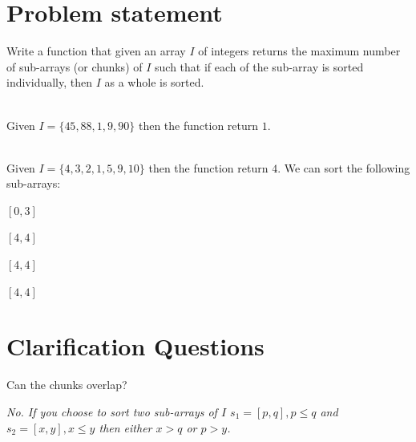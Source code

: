 \section{Problem statement}
\begin{exercise}
\label{example:max_num_chunks_sorted:exercice1}
Write a function that given an array $I$ of integers returns the maximum number of sub-arrays (or chunks) of $I$ 
such that if each of the sub-array is sorted individually, then $I$ as a whole is sorted.

    \begin{example}
        \label{example:max_num_chunks_sorted:example1}
        \hfill \\
        Given $I=\{45,88,1,9,90\}$ then the function return $1$.
        
    \end{example}

    \begin{example}
        \label{example:max_num_chunks_sorted:example2}
        \hfill \\
        Given $I=\{4,3,2,1,5,9,10\}$ then the function return $4$. We can sort the following sub-arrays:
        \begin{itemize*}
            \item $[0,3]$
            \item $[4,4]$
            \item $[4,4]$
            \item $[4,4]$
        \end{itemize*}
    \end{example}
\end{exercise}

\section{Clarification Questions}

\begin{QandA}
    \item \begin{questionitem} \begin{question} Can the chunks overlap?   \end{question}      
    \begin{answered}
        \textit{No. If you choose to sort two sub-arrays of $I$ $s_1=[p,q], p\leq q$ and $s_2=[x,y], x\leq y$ then either $x > q$ or $p>y$.}
    \end{answered} \end{questionitem}
    
\end{QandA}


